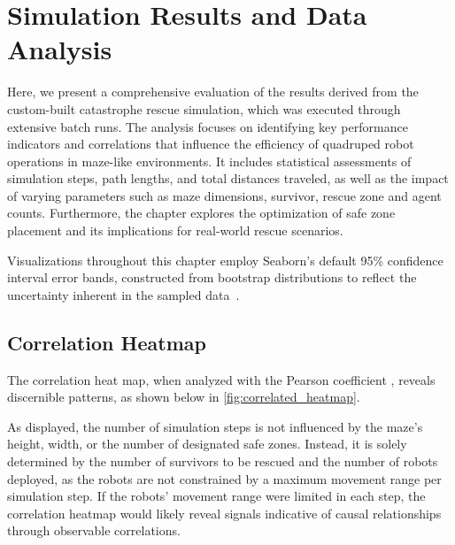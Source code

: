 \documentclass[3p,times,procedia]{elsarticle}
\begin{document}
\section{Simulation Results and Data Analysis}
\label{sec:data_analysis}
Here, we present a comprehensive evaluation of the results derived from the custom-built catastrophe rescue simulation, which was executed through extensive batch runs. The analysis focuses on identifying key performance indicators and correlations that influence the efficiency of quadruped robot operations in maze-like environments. It includes statistical assessments of simulation steps, path lengths, and total distances traveled, as well as the impact of varying parameters such as maze dimensions, survivor, rescue zone and agent counts. Furthermore, the chapter explores the optimization of safe zone placement and its implications for real-world rescue scenarios. 

Visualizations throughout this chapter employ Seaborn’s default 95\% confidence interval error bands, constructed from bootstrap distributions to reflect the uncertainty inherent in the sampled data\ \cite{Waskom2021seaborn}.

\subsection{Correlation Heatmap}
\label{subsec:correlation_heatmap}

The correlation heat map, when analyzed with the Pearson coefficient \cite{KIRCH2008Pearson}, reveals discernible patterns, as shown below in \autoref{fig:correlated_heatmap}.

 
As displayed, the number of simulation steps is not influenced by the maze’s height, width, or the number of designated safe zones. 
Instead, it is solely determined by the number of survivors to be rescued and the number of robots deployed, as the robots are not constrained by a maximum movement range per simulation step. 
If the robots’ movement range were limited in each step, the correlation heatmap would likely reveal signals indicative of causal relationships through observable correlations.
\end{document}
